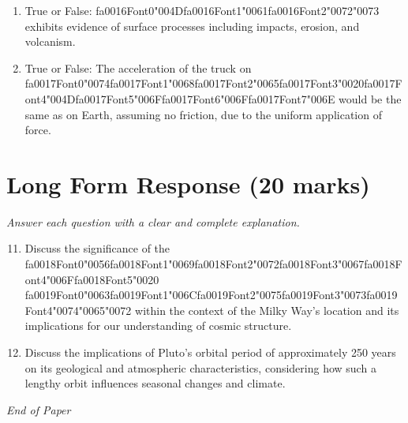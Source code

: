 \documentclass[12pt]{article}
\begin{document}
\begin{enumerate}[label=\arabic*.]
\item True or False: {\csname fa0016Font0\endcsname\char"004D}{\csname fa0016Font1\endcsname\char"0061}{\csname fa0016Font2\endcsname\char"0072}{\char"0073} exhibits evidence of surface processes including impacts, erosion, and volcanism.
\item True or False: The acceleration of the truck on {\csname fa0017Font0\endcsname\char"0074}{\csname fa0017Font1\endcsname\char"0068}{\csname fa0017Font2\endcsname\char"0065}{\csname fa0017Font3\endcsname\char"0020}{\csname fa0017Font4\endcsname\char"004D}{\csname fa0017Font5\endcsname\char"006F}{\csname fa0017Font6\endcsname\char"006F}{\csname fa0017Font7\endcsname\char"006E} would be the same as on Earth, assuming no friction, due to the uniform application of force.
\end{enumerate}

\section*{Long Form Response (20 marks)}
\textit{Answer each question with a clear and complete explanation.}
\begin{enumerate}[label=\arabic*.]
\setcounter{enumi}{10}
\item Discuss the significance of the {\csname fa0018Font0\endcsname\char"0056}{\csname fa0018Font1\endcsname\char"0069}{\csname fa0018Font2\endcsname\char"0072}{\csname fa0018Font3\endcsname\char"0067}{\csname fa0018Font4\endcsname\char"006F}{\csname fa0018Font5\endcsname\char"0020} {\csname fa0019Font0\endcsname\char"0063}{\csname fa0019Font1\endcsname\char"006C}{\csname fa0019Font2\endcsname\char"0075}{\csname fa0019Font3\endcsname\char"0073}{\csname fa0019Font4\endcsname\char"0074}{\char"0065}{\char"0072} within the context of the Milky
Way's location and its implications for our understanding of cosmic structure.
\item Discuss the implications of Pluto's orbital period of approximately 250 years on its
geological and atmospheric characteristics, considering how such a lengthy orbit
influences seasonal changes and climate.
\end{enumerate}

\vfill
\noindent\textit{End of Paper}
\end{document}
